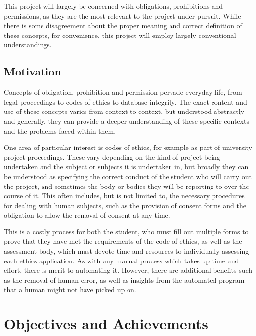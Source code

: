 \documentclass{l4proj}
\begin{document}
This project will largely be concerned with obligations, prohibitions and permissions, as they are the most relevant to the project under pursuit. While there is some disagreement about the proper meaning and correct definition of these concepts, for convenience, this project will employ largely conventional understandings. 

\subsection{Motivation}
Concepts of obligation, prohibition and permission pervade everyday life, from legal proceedings to codes of ethics to database integrity. The exact content and use of these concepts varies from context to context, but understood abstractly and generally, they can provide a deeper understanding of these specific contexts and the problems faced within them. 

One area of particular interest is codes of ethics, for example as part of university project proceedings. These vary depending on the kind of project being undertaken and the subject or subjects it is undertaken in, but broadly they can be understood as specifying the correct conduct of the student who will carry out the project, and sometimes the body or bodies they will be reporting to over the course of it. This often includes, but is not limited to, the necessary procedures for dealing with human subjects, such as the provision of consent forms and the obligation to allow the removal of consent at any time. 

This is a costly process for both the student, who must fill out multiple forms to prove that they have met the requirements of the code of ethics, as well as the assessment body, which must devote time and resources to individually assessing each ethics application. As with any manual process which takes up time and effort, there is merit to automating it. However, there are additional benefits such as the removal of human error, as well as insights from the automated program that a human might not have picked up on. 

\section{Objectives and Achievements} %
\end{document}
